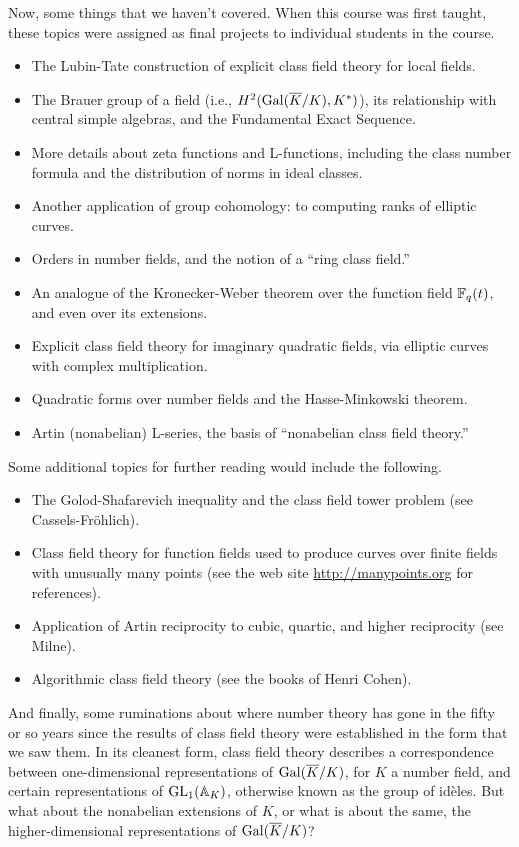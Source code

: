 Now, some things that we haven't covered. When this course was first taught, these topics were assigned as final projects to individual students in the course.
\begin{itemize}
\item
The Lubin-Tate construction of explicit class field theory for local
fields.
\item
The Brauer group of a field (i.e., $H^2(\operatorname{Gal}(\overline{K}/K), K^*)$),
its relationship with central simple algebras, and the Fundamental Exact
Sequence.
\item
More details about zeta functions and L-functions, including
the class number formula and the distribution of norms in ideal classes.
\item
Another application of group cohomology: to computing
ranks of elliptic curves.
\item
Orders in number fields, and the notion of a ``ring class field.''
\item
An analogue of the Kronecker-Weber theorem over the function field
$\mathbb{F}_q(t)$, and even over its extensions.
\item
Explicit class field theory for imaginary quadratic fields, via elliptic
curves with complex multiplication.
\item
Quadratic forms over number fields and the Hasse-Minkowski theorem.
\item
Artin (nonabelian) L-series, the basis of ``nonabelian class field theory.''
\end{itemize}

Some additional topics for further reading would include the following.
\begin{itemize}
\item The Golod-Shafarevich inequality and the class field tower problem
(see Cassels-Fr\"ohlich).
\item Class field theory for function fields used to produce curves
over finite fields with unusually many points (see the web site \url{http://manypoints.org} for references).
\item
Application of Artin reciprocity to cubic, quartic, and higher reciprocity
(see Milne).
\item
Algorithmic class field theory (see the books of Henri Cohen).
\end{itemize}

And finally, some ruminations about where number theory has gone in the fifty
or so years since the results of class field theory were established in the
form that we saw them. 
In its cleanest form, class field theory describes a
correspondence between one-dimensional representations of
$\operatorname{Gal}(\overline{K}/K)$, for $K$ a number field, and certain representations
of $\operatorname{GL}_1(\mathbb{A}_K)$, otherwise known as the group of id\`eles. But what about
the nonabelian extensions of $K$, or what is about the same, the
higher-dimensional representations of $\operatorname{Gal}(\overline{K}/K)$?

